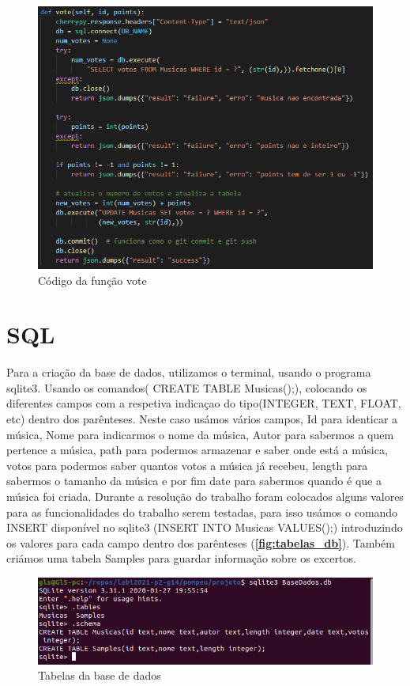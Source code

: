 \documentclass{report}
\begin{document}
\begin{figure}[!h]
\center 
\includegraphics[width=330pt]{img/vote.png}
\caption{Código da função vote}
\label{fig:vote}
\end{figure}

\section{SQL}
\label{sec:sql}
Para a criação da base de dados, utilizamos o terminal, usando o programa sqlite3.
Usando os comandos( CREATE TABLE Musicas();), colocando os diferentes campos com a 
respetiva indicaçao do tipo(INTEGER, TEXT, FLOAT, etc) dentro dos parênteses.
Neste caso usámos vários campos, Id para identicar a música, Nome para indicarmos 
o nome da música, Autor para sabermos a quem pertence a música, path para podermos 
armazenar e saber onde está a música, votos para podermos saber quantos votos a 
música já recebeu, length para sabermos o tamanho da música e por fim date para 
sabermos quando é que a música foi criada.
Durante a resolução do trabalho foram colocados alguns valores para as funcionalidades 
do trabalho serem testadas, para isso usámos o comando INSERT disponível no sqlite3 
(INSERT INTO Musicas VALUES();) introduzindo os valores para cada campo dentro dos 
parênteses (\textbf{\autoref{fig:tabelas_db}}).
Também criámos uma tabela Samples para guardar informação sobre os excertos.

\begin{figure}[!h]
\center 
\includegraphics[width=330pt]{img/tabelas_db.png}
\caption{Tabelas da base de dados}
\label{fig:tabelas_db}
\end{figure}
\end{document}
